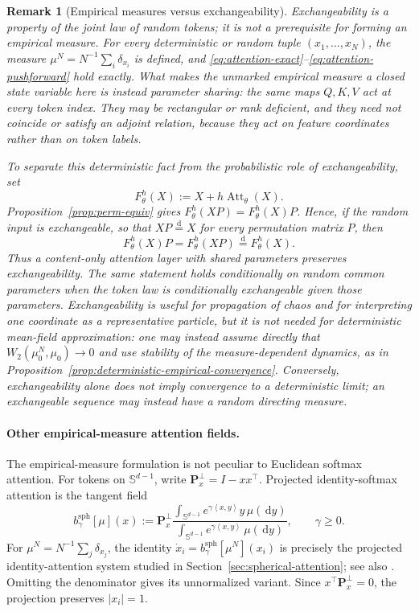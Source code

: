 \documentclass[11pt]{amsart}
\numberwithin{equation}{section}
\theoremstyle{plain}
\newtheorem{remark}[theorem]{Remark}
\newcommand{\dd}{\,\mathrm{d}}
\newcommand{\abs}[1]{\left\lvert#1\right\rvert}
\newcommand{\ip}[2]{\left\langle#1,#2\right\rangle}
\begin{document}
\begin{remark}[Empirical measures versus exchangeability]
Exchangeability is a property of the joint law of random tokens; it is not a
prerequisite for forming an empirical measure.  For every deterministic or
random tuple $(x_1,\ldots,x_N)$, the measure
$\mu^N=N^{-1}\sum_i\delta_{x_i}$ is defined, and
\eqref{eq:attention-exact}--\eqref{eq:attention-pushforward} hold exactly.
What makes the \emph{unmarked} empirical measure a closed state variable here
is instead parameter sharing: the same maps $Q,K,V$ act at every token index.
They may be rectangular or rank deficient, and they need not coincide or
satisfy an adjoint relation, because they act on feature coordinates rather
than on token labels.

To separate this deterministic fact from the probabilistic role of
exchangeability, set
\[
 F_\theta^h(X):=X+h\operatorname{Att}_\theta(X).
\]
Proposition~\ref{prop:perm-equiv} gives
$F_\theta^h(XP)=F_\theta^h(X)P$.  Hence, if the random input is exchangeable,
so that $XP\stackrel{\mathrm d}=X$ for every permutation matrix $P$, then
\[
 F_\theta^h(X)P=F_\theta^h(XP)
 \stackrel{\mathrm d}=F_\theta^h(X).
\]
Thus a content-only attention layer with shared parameters preserves
exchangeability.  The same statement holds conditionally on random common
parameters when the token law is conditionally exchangeable given those
parameters.  Exchangeability is useful for propagation of chaos and for
interpreting one coordinate as a representative particle, but it is not
needed for deterministic mean-field approximation: one may instead assume
directly that $W_2(\mu_0^N,\mu_0)\to0$ and use stability of the
measure-dependent dynamics, as in
Proposition~\ref{prop:deterministic-empirical-convergence}.  Conversely,
exchangeability alone does not imply convergence to a deterministic limit;
an exchangeable sequence may instead have a random directing measure.
\end{remark}


\paragraph{\textbf{Other empirical-measure attention fields.}}
The empirical-measure formulation is not peculiar to Euclidean softmax
attention.  For tokens on $\mathbb S^{d-1}$, write
$\mathbf P_x^\perp=I-xx^\top$.  Projected identity-softmax attention is the
tangent field
\begin{equation}\label{eq:spherical-attention-field}
 b_\gamma^{\mathrm{sph}}[\mu](x)
 :=\mathbf P_x^\perp
 \frac{\displaystyle\int_{\mathbb S^{d-1}}
       e^{\gamma\ip{x}{y}}y\,\mu(\dd y)}
      {\displaystyle\int_{\mathbb S^{d-1}}
       e^{\gamma\ip{x}{y}}\,\mu(\dd y)},
 \qquad \gamma\geq0.
\end{equation}
For $\mu^N=N^{-1}\sum_j\delta_{x_j}$, the identity
$\dot x_i=b_\gamma^{\mathrm{sph}}[\mu^N](x_i)$ is precisely the projected
identity-attention system studied in Section~\ref{sec:spherical-attention};
see also \cite{Rigollet2026MeanField}.  Omitting the denominator gives its
unnormalized variant.  Since
$x^\top\mathbf P_x^\perp=0$, the projection preserves $\abs{x_i}=1$.
\end{document}
